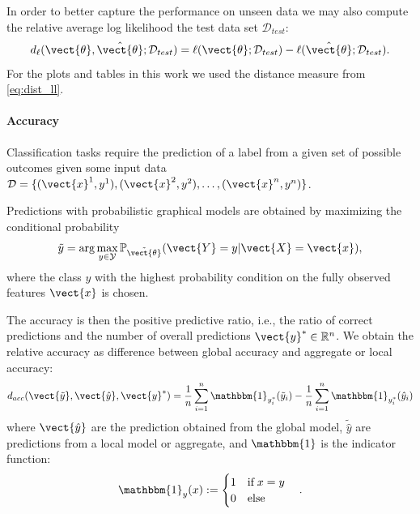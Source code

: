In order to better capture the performance on unseen data we may also compute the relative average log likelihood \wrt the test data set $\mathcal{D}_{test}$:
\begin{equation}
    \label{eq:dist_ll_test}
    d_{\ell}(\vect{\theta}, \hat{\vect{\theta}}; \mathcal{D}_{test}) = \ell(\vect{\theta} ; \mathcal{D}_{test}) - \ell(\hat{\vect{\theta}} ; \mathcal{D}_{test}).
\end{equation}
For the plots and tables in this work we used the distance measure from \autoref{eq:dist_ll}.

\paragraph*{Accuracy}
Classification tasks require the prediction of a label from a given set of possible outcomes given some input data  $\mathcal{D} = \{(\vect{x}^1, y^1), (\vect{x}^2, y^2), \ldots, (\vect{x}^n, y^n)\}$.

Predictions with probabilistic graphical models are obtained by maximizing the conditional probability
\begin{equation}
    \tilde{y} = \arg\max_{y \in \mathcal{Y}} \mathbb{P}_{\tilde{\vect{\theta}}}(\vect{Y} = y \lvert \vect{X} = \vect{x}) ,
\end{equation}
where the class $y$ with the highest probability condition on the fully observed features $\vect{x}$ is chosen.

The accuracy is then the positive predictive ratio, i.e., the ratio of correct predictions and the number of overall predictions $\vect{y}^* \in \mathbb{R}^n$.
We obtain the relative accuracy as difference between global accuracy and aggregate or local accuracy:
\begin{equation}
    d_{acc}(\vect{\tilde{y}}, \vect{\hat{y}}, \vect{y}^*) = \frac{1}{n} \sum_{i=1}^n \mathbbm{1}_{y_i^*}(\tilde{y}_i) - \frac{1}{n} \sum_{i=1}^n \mathbbm{1}_{y_i^*}(\hat{y}_i)
\end{equation}
where $\vect{\hat{y}}$ are the prediction obtained from the global model, $\tilde{\hat{y}}$ are predictions from a local model or aggregate, and $\mathbbm{1}$ is the indicator function:
\begin{equation}
    \mathbbm{1}_{y}(x) := \begin{cases}
        1 \quad \text{if}\; x = y\\
        0 \quad \text{else}
    \end{cases}.
\end{equation}

